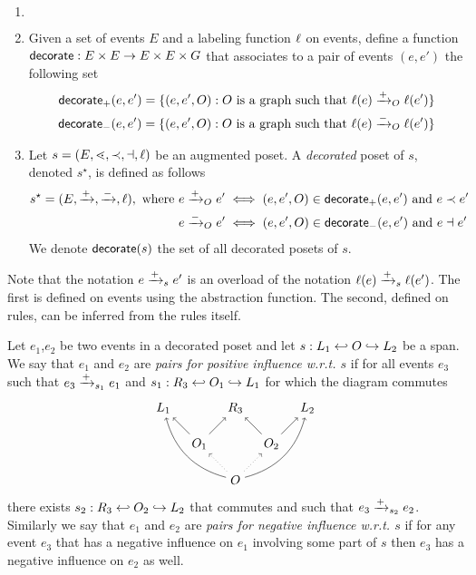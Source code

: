 \begin{definition}
  \label{def:decorate_poset}
  \begin{enumerate}
  \item[] $~$
  \item Given a set of events $E$ and a labeling function $\ell$ on events, define a function $\mathsf{decorate}:E\times E \to E\times E\times G$ that associates to a pair of events $(e,e')$ the following set
    \begin{align*}
      \mathsf{decorate}_{+}(e,e') = \{(e,e',O) : O\text{ is a graph such that }\ell(e)\mathrel{\xrightarrow{+}}_O \ell(e')\}\\
       \mathsf{decorate}_{-}(e,e') = \{(e,e',O) : O\text{ is a graph such that }\ell(e)\mathrel{\xrightarrow{-}}_O \ell(e')\}
    \end{align*}

  \item Let $s = (E,\lessdot,\prec,\dashv,\ell)$ be an augmented poset. A \emph{decorated} poset of $s$, denoted $s^{\star}$, is defined as follows
    \begin{align*}
      s^{\star} = (E,\mathrel{\xrightarrow{+}},\mathrel{\xrightarrow{-}},\ell), \text{ where }
      &e\mathrel{\xrightarrow{+}}_O e' \iff (e,e',O)\in\mathsf{decorate}_+(e,e')\text{ and }e\prec e'\\
      &e\mathrel{\xrightarrow{-}}_O e' \iff (e,e',O)\in\mathsf{decorate}_-(e,e')\text{ and }e\dashv e'\\
    \end{align*}
    We denote $\mathsf{decorate}(s)$ the set of all decorated posets of $s$.
  \end{enumerate}
\end{definition}

Note that the notation $e\mathrel{\xrightarrow{+}}_s e'$ is an overload of the notation $\ell(e)\mathrel{\xrightarrow{+}}_s \ell(e')$. The first is defined on events using the abstraction function. The second, defined on rules, can be inferred from the rules itself.

\begin{definition}
  Let $e_1$,$e_2$ be two events in a decorated poset and let $s:L_1\hookleftarrow O\hookrightarrow L_2$ be a span. We say that $e_1$ and $e_2$ are \emph{pairs for positive influence w.r.t. $s$} if for all events $e_3$ such that $e_3\mathrel{\xrightarrow{+}}_{s_1} e_1$ and $s_1:R_3\hookleftarrow O_1\hookrightarrow L_1$ for which the diagram commutes
  \[
  \begin{tikzpicture} %
      \node (o) at (0,-1) {\(O\)};
      \node (r3) at (0,1) {\(R_3\)};
      \node (o1) at (-1,0) {\(O_1\)};
      \node (o2) at (1,0) {\(O_2\)};
      \node (r1) at (-2,1) {\(L_1\)};
      \node (r2) at (2,1) {\(L_2\)};
      \draw [dotted,->] (o) -- (o1);
      \draw [dotted,->] (o) -- (o2);
      \draw [->] (o1) -- (r3);
      \draw [->] (o2) -- (r3);
      \draw [->] (o1) -- (r1);
      \draw [->] (o2) -- (r2);
      \draw [->] (o) to [bend left] (r1);
      \draw [->] (o) to [bend right] (r2);
    \end{tikzpicture}
    \]
there exists $s_2:R_3\hookleftarrow O_2\hookrightarrow L_2$ that commutes and such that $e_3\mathrel{\xrightarrow{+}}_{s_2} e_2$.
Similarly we say that $e_1$ and $e_2$ are \emph{pairs for negative influence w.r.t. $s$} if for any event $e_3$ that has a negative influence on $e_1$ involving some part of $s$ then $e_3$ has a negative influence on $e_2$ as well.
\end{definition}

